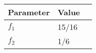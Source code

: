 \begin{tabular}{|l|l|c|}
\hline
\textbf{Parameter} & \textbf{Value} \\
\hline
$f_{1}$ &  15/16 \\
\hline
$f_{2}$ & 1/6\\
\hline
\end{tabular}

